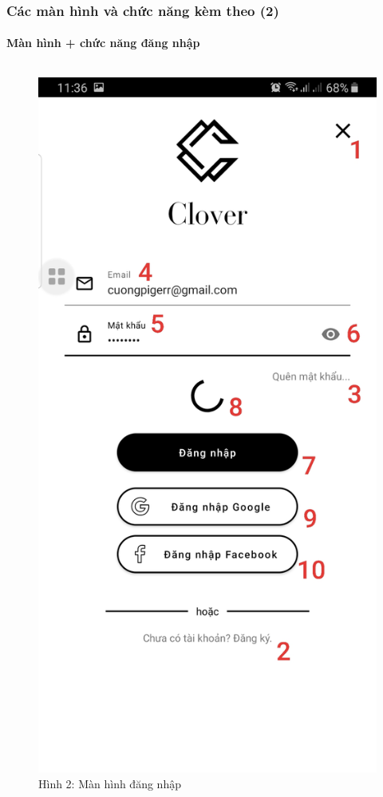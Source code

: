 \documentclass{beamer}
\begin{document}
\begin{frame}
    \frametitle{Các màn hình và chức năng kèm theo (2)}
    \framesubtitle{Màn hình + chức năng đăng nhập}

    \begin{columns}
        \begin{figure}
            \centering
            \includegraphics[height=0.7\textheight]{images/02.png}
            \caption{\centering\tiny{Hình 2: Màn hình đăng nhập}}


\end{figure}
\end{columns}
\end{frame}
\end{document}
